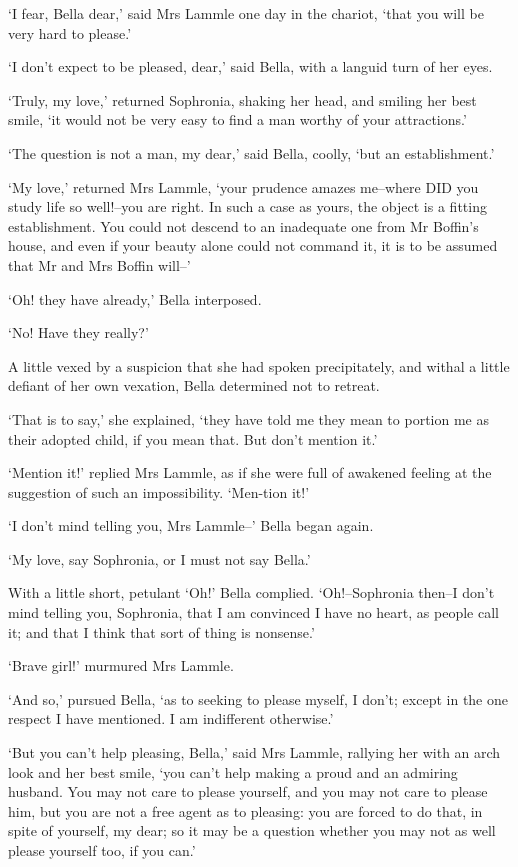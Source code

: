 ‘I fear, Bella dear,’ said Mrs Lammle one day in the chariot, ‘that you
will be very hard to please.’

‘I don’t expect to be pleased, dear,’ said Bella, with a languid turn of
her eyes.

‘Truly, my love,’ returned Sophronia, shaking her head, and smiling
her best smile, ‘it would not be very easy to find a man worthy of your
attractions.’

‘The question is not a man, my dear,’ said Bella, coolly, ‘but an
establishment.’

‘My love,’ returned Mrs Lammle, ‘your prudence amazes me--where DID you
study life so well!--you are right. In such a case as yours, the object
is a fitting establishment. You could not descend to an inadequate one
from Mr Boffin’s house, and even if your beauty alone could not command
it, it is to be assumed that Mr and Mrs Boffin will--’

‘Oh! they have already,’ Bella interposed.

‘No! Have they really?’

A little vexed by a suspicion that she had spoken precipitately, and
withal a little defiant of her own vexation, Bella determined not to
retreat.

‘That is to say,’ she explained, ‘they have told me they mean to portion
me as their adopted child, if you mean that. But don’t mention it.’

‘Mention it!’ replied Mrs Lammle, as if she were full of awakened
feeling at the suggestion of such an impossibility. ‘Men-tion it!’

‘I don’t mind telling you, Mrs Lammle--’ Bella began again.

‘My love, say Sophronia, or I must not say Bella.’

With a little short, petulant ‘Oh!’ Bella complied. ‘Oh!--Sophronia
then--I don’t mind telling you, Sophronia, that I am convinced I have
no heart, as people call it; and that I think that sort of thing is
nonsense.’

‘Brave girl!’ murmured Mrs Lammle.

‘And so,’ pursued Bella, ‘as to seeking to please myself, I don’t;
except in the one respect I have mentioned. I am indifferent otherwise.’

‘But you can’t help pleasing, Bella,’ said Mrs Lammle, rallying her with
an arch look and her best smile, ‘you can’t help making a proud and an
admiring husband. You may not care to please yourself, and you may not
care to please him, but you are not a free agent as to pleasing: you
are forced to do that, in spite of yourself, my dear; so it may be a
question whether you may not as well please yourself too, if you can.’

